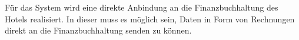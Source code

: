 \documentclass[../../Pflichtenheft.tex]{subfiles}
\begin{document}
    Für das System wird eine direkte Anbindung an die Finanzbuchhaltung des Hotels realisiert.
    In dieser muss es möglich sein, Daten in Form von Rechnungen direkt an die Finanzbuchhaltung senden zu können.
\end{document}
